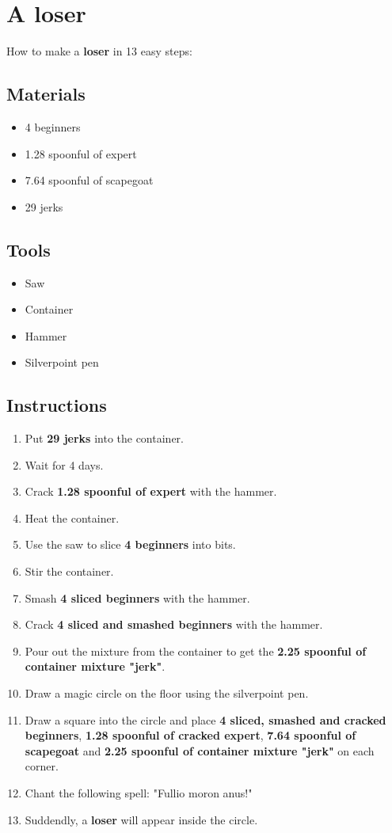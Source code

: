 \documentclass{article}
\begin{document}
\section{A loser}How to make a \textbf{loser} in 13 easy steps:

\subsection{Materials}\begin{itemize}
\item 
4 beginners
\item 
1.28 spoonful of expert
\item 
7.64 spoonful of scapegoat
\item 
29 jerks
\end{itemize}
\subsection{Tools}\begin{itemize}
\item 
Saw
\item 
Container
\item 
Hammer
\item 
Silverpoint pen
\end{itemize}
\subsection{Instructions}\begin{enumerate}
\item 
Put \textbf{29 jerks} into the container.
\item 
Wait for 4 days.
\item 
Crack \textbf{1.28 spoonful of expert} with the hammer.
\item 
Heat the container.
\item 
Use the saw to slice \textbf{4 beginners} into bits.
\item 
Stir the container.
\item 
Smash \textbf{4 sliced beginners} with the hammer.
\item 
Crack \textbf{4 sliced and smashed beginners} with the hammer.
\item 
Pour out the mixture from the container to get the \textbf{2.25 spoonful of container mixture "jerk"}.
\item 
Draw a magic circle on the floor using the silverpoint pen.
\item 
Draw a square into the circle and place \textbf{4 sliced, smashed and cracked beginners}, \textbf{1.28 spoonful of cracked expert}, \textbf{7.64 spoonful of scapegoat} and \textbf{2.25 spoonful of container mixture "jerk"} on each corner.
\item 
Chant the following spell: "Fullio moron anus!"
\item 
Suddendly, a \textbf{loser} will appear inside the circle.
\end{enumerate}
\newpage
\end{document}
